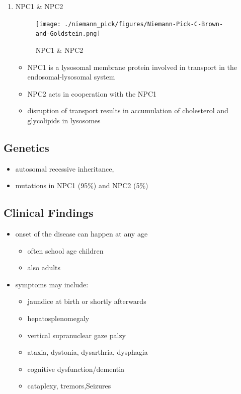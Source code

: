 \documentclass{scrartcl}
\begin{document}
\begin{enumerate}
\item NPC1 \& NPC2
\label{sec:org37f2cd4}

\begin{figure}[htbp]
\centering
\texttt{[image: ./niemann\_pick/figures/Niemann-Pick-C-Brown-and-Goldstein.png]}
\caption{\label{fig:orgcf13cfc}
NPC1 \& NPC2}
\end{figure}

\begin{itemize}
\item NPC1 is a lysosomal membrane protein involved in transport in the endosomal-lysosomal system
\item NPC2 acts in cooperation with the NPC1
\item disruption of transport results in accumulation of cholesterol and glycolipids in lysosomes
\end{itemize}
\end{enumerate}

\subsection{Genetics}
\label{sec:orga59c4a8}
\begin{itemize}
\item autosomal recessive inheritance,
\item mutations in NPC1 (95\%) and NPC2 (5\%)
\end{itemize}

\subsection{Clinical Findings}
\label{sec:org0b392b4}
\begin{itemize}
\item onset of the disease can happen at any age
\begin{itemize}
\item often school age children
\item also adults
\end{itemize}

\item symptoms may include:
\begin{itemize}
\item jaundice at birth or shortly afterwards
\item hepatosplenomegaly
\item vertical supranuclear gaze palzy
\item ataxia, dystonia, dysarthria, dysphagia
\item cognitive dysfunction/dementia
\item cataplexy, tremors,Seizures
\end{itemize}
\end{itemize}
\end{document}
